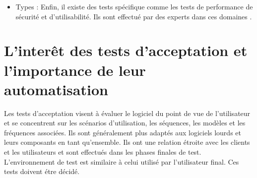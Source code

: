 \begin{itemize}
\item Types : Enfin, il existe des tests spécifique comme les tests de performance de sécurité et d'utilisabilité. Ils sont effectué par des experts dans ces domaines \parencite{classification}.



\end{itemize}



\section[les tests d'acceptation et l'automatisation]{L'interêt des tests d'acceptation et l'importance de leur automatisation}
Les tests d'acceptation visent à évaluer le logiciel du point de vue de l'utilisateur et se concentrent sur les scénarios d'utilisation, les séquences, les modèles et les fréquences associées. Ils sont généralement plus adaptés aux logiciels lourds et leurs composants en tant qu'ensemble. Ils ont une relation étroite avec les clients et les utilisateurs et sont effectués dans les phases finales de test. L'environnement de test est similaire à celui utilisé par l'utilisateur final. Ces tests doivent étre décidé. 



